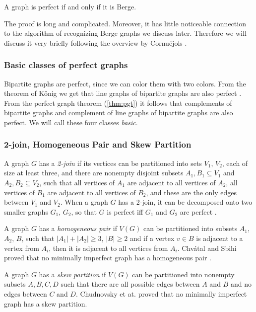 \begin{theorem}
	\label{thm:spgt}
	A graph is perfect if and only if it is Berge.
\end{theorem}

The proof is long and complicated. Moreover, it has little noticeable connection to the algorithm of recognizing Berge graphs we discuss later. Therefore we will discuss it very briefly following the overview by Cornuéjols \cite{GC03}.

\subsubsection{Basic classes of perfect graphs}
Bipartite graphs are perfect, since we can color them with two colors. From the theorem of König we get that line graphs of bipartite graphs are also perfect \cite{Knig1916, GC03}. From the perfect graph theorem (\cref{thm:pgt}) it follows that complements of bipartite graphs and complement of line graphs of bipartite graphs are also perfect. We will call these four classes \emph{basic}.

\subsubsection{2-join, Homogeneous Pair and Skew Partition}
A graph $G$ has a \emph{2-join} if its vertices can be partitioned into sets $V_1$, $V_2$, each of size at least three, and there are nonempty disjoint subsets $A_1, B_1 \subseteq V_1$ and $A_2, B_2 \subseteq V_2$, such that all vertices of $A_1$ are adjacent to all vertices of $A_2$, all vertices of $B_1$ are adjacent to all vertices of $B_2$, and these are the only edges between $V_1$ and $V_2$. When a graph $G$ has a 2-join, it can be decomposed onto two smaller graphs $G_1$, $G_2$, so that $G$ is perfect iff $G_1$ and $G_2$ are perfect \cite{Cornujols1985}.

A graph $G$ has a \emph{homogeneous pair} if $V(G)$ can be partitioned into subsets $A_1$, $A_2$, $B$, such that $|A_1|+|A_2| \geq 3$, $|B| \geq 2$ and if a vertex $v \in B$ is adjacent to a vertex from $A_i$, then it is adjacent to all vertices from $A_i$. Chvátal and Sbihi proved that no minimally imperfect graph has a homogeneous pair \cite{Chvtal1987}.

A graph $G$ has a \emph{skew partition} if $V(G)$ can be partitioned into nonempty subsets $A, B, C, D$ such that there are all possible edges between $A$ and $B$ and no edges between $C$ and $D$. Chudnovsky et at. proved that no minimally imperfect graph has a skew partition.

